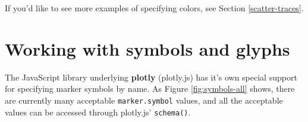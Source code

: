 \documentclass[
  12pt,
]{krantz}
\newenvironment{Shaded}{\begin{snugshade}}{\end{snugshade}}
\newcommand{\DataTypeTok}[1]{\textcolor[rgb]{0.13,0.29,0.53}{#1}}
\newcommand{\DecValTok}[1]{\textcolor[rgb]{0.00,0.00,0.81}{#1}}
\newcommand{\KeywordTok}[1]{\textcolor[rgb]{0.13,0.29,0.53}{\textbf{#1}}}
\newcommand{\NormalTok}[1]{#1}
\newcommand{\OperatorTok}[1]{\textcolor[rgb]{0.81,0.36,0.00}{\textbf{#1}}}
\newcommand{\StringTok}[1]{\textcolor[rgb]{0.31,0.60,0.02}{#1}}
\begin{document}
If you'd like to see more examples of specifying colors, see Section \ref{scatter-traces}.

\hypertarget{working-with-symbols}{%
\chapter{Working with symbols and glyphs}\label{working-with-symbols}}

The JavaScript library underlying \textbf{plotly} (plotly.js) has it's own special support for specifying marker symbols by name. As Figure \ref{fig:symbols-all} shows, there are currently many acceptable \texttt{marker.symbol} values, and all the acceptable values can be accessed through plotly.js' \texttt{schema()}.

\begin{Shaded}
\end{Shaded}
\end{document}
